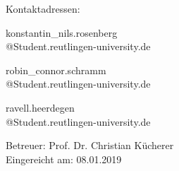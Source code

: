 \begin{titlepage}
\begin{center}
\vspace*{0.6cm}

Kontaktadressen:\\

\vspace*{0.3cm}
\begin{minipage}[H]{4cm}
\centering
{\normalsize konstantin\_nils.rosenberg\\@Student.reutlingen-university.de}
\\
\end{minipage}
\hfill
\begin{minipage}[H]{4cm}
\centering
{\normalsize robin\_connor.schramm\\@Student.reutlingen-university.de}\\
\end{minipage}
\hfill
\begin{minipage}[H]{4cm}
\centering
{\normalsize ravell.heerdegen\\@Student.reutlingen-university.de}
\\
\end{minipage}

\vspace*{0.8cm}
Betreuer: Prof. Dr. Christian Kücherer\\
\vspace*{0.4cm}
Eingereicht am:	08.01.2019



\end{center}

\end{titlepage}